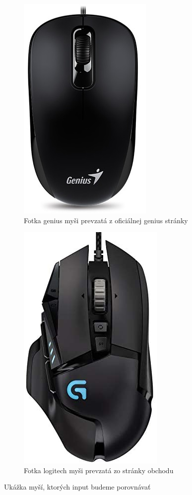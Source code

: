 \begin{figure}[!htb]
\centering
\begin{subfigure}{.5\textwidth}
  \centering
  \includegraphics[width=.4\linewidth]{img/genius_mys.jpg}
  \caption{Fotka genius myši prevzatá z oficiálnej genius stránky~\cite{genius_mouse_pic}}
  \label{obr:uvod:genius:mouse:pic}
\end{subfigure}%
\begin{subfigure}{.5\textwidth}
  \centering
  \includegraphics[width=.4\linewidth]{img/logitech_mys}
  \caption{Fotka logitech myši prevzatá zo stránky obchodu~\cite{logitech_mouse_pic}}
  \label{fig:sub2}
\end{subfigure}
\caption{Ukážka myší, ktorých input budeme porovnávať}
\label{obr:uvod:logitech:mouse:pic}
\end{figure}

